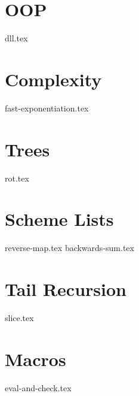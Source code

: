 \documentclass{exam}
\begin{document}
\section{OOP}
\begin{questions}
{dll.tex}
\end{questions}

\section{Complexity}
\begin{questions}
{fast-exponentiation.tex}
\end{questions}

\section{Trees}
\begin{questions}
{rot.tex}
\end{questions}

\section{Scheme Lists}
\begin{questions}
{reverse-map.tex}
{backwards-sum.tex}
\end{questions}

\section{Tail Recursion}
\begin{questions}
{slice.tex}
\end{questions}

\section{Macros}
\begin{questions}
{eval-and-check.tex}
\end{questions}
\end{document}
